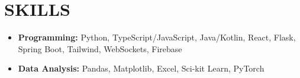 \section*{SKILLS}
\noindent
\begin{itemize}
	\item \textbf{Programming:} Python, TypeScript/JavaScript, Java/Kotlin, React, Flask, Spring Boot, Tailwind, WebSockets, Firebase
	\item \textbf{Data Analysis:} Pandas, Matplotlib, Excel, Sci-kit Learn, PyTorch
\end{itemize}

